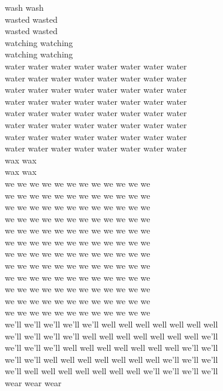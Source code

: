 wash wash\\
wasted wasted\\
wasted wasted\\
watching watching\\
watching watching\\
water water water water water water water water\\
water water water water water water water water\\
water water water water water water water water\\
water water water water water water water water\\
water water water water water water water water\\
water water water water water water water water\\
water water water water water water water water\\
water water water water water water water water\\
wax wax\\
wax wax\\
we we we we we we we we we we we we\\
we we we we we we we we we we we we\\
we we we we we we we we we we we we\\
we we we we we we we we we we we we\\
we we we we we we we we we we we we\\
we we we we we we we we we we we we\\
we we we we we we we we we we we we\\
we we we we we we we we we we we we\\
we we we we we we we we we we we we\\
we we we we we we we we we we we we\\
we we we we we we we we we we we we\\
we we we we we we we we we we we we\\
we'll we'll we'll we'll we'll well well well well well well well\\
we'll we'll we'll we'll well well well well well well well we'll\\
we'll we'll we'll well well well well well well well we'll we'll\\
we'll we'll well well well well well well well we'll we'll we'll\\
we'll well well well well well well well we'll we'll we'll we'll\\
wear wear wear\\
